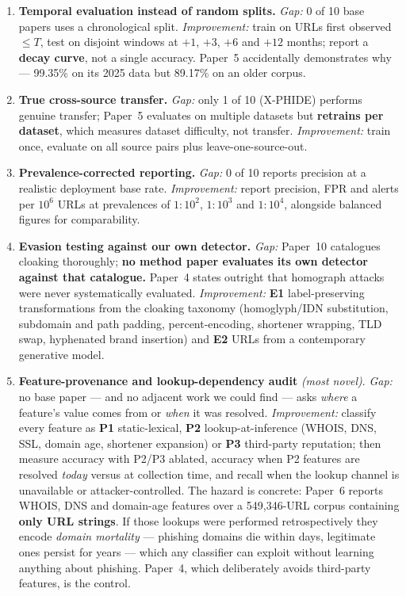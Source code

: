 \documentclass[10pt,a4paper]{article}
\begin{document}
\begin{enumerate}[label=\textbf{\arabic*.}]

\item \textbf{Temporal evaluation instead of random splits.}
\emph{Gap:} 0 of 10 base papers uses a chronological split.
\emph{Improvement:} train on URLs first observed $\le T$, test on disjoint windows at $+1$, $+3$,
$+6$ and $+12$ months; report a \textbf{decay curve}, not a single accuracy. Paper~5 accidentally
demonstrates why --- 99.35\% on its 2025 data but 89.17\% on an older corpus.

\item \textbf{True cross-source transfer.}
\emph{Gap:} only 1 of 10 (X-PHIDE) performs genuine transfer; Paper~5 evaluates on multiple
datasets but \textbf{retrains per dataset}, which measures dataset difficulty, not transfer.
\emph{Improvement:} train once, evaluate on all source pairs plus leave-one-source-out.

\item \textbf{Prevalence-corrected reporting.}
\emph{Gap:} 0 of 10 reports precision at a realistic deployment base rate.
\emph{Improvement:} report precision, FPR and alerts per $10^{6}$ URLs at prevalences of
$1{:}10^{2}$, $1{:}10^{3}$ and $1{:}10^{4}$, alongside balanced figures for comparability.

\item \textbf{Evasion testing against our own detector.}
\emph{Gap:} Paper~10 catalogues cloaking thoroughly; \textbf{no method paper evaluates its own
detector against that catalogue.} Paper~4 states outright that homograph attacks were never
systematically evaluated.
\emph{Improvement:} \textbf{E1} label-preserving transformations from the cloaking taxonomy
(homoglyph/IDN substitution, subdomain and path padding, percent-encoding, shortener wrapping,
TLD swap, hyphenated brand insertion) and \textbf{E2} URLs from a contemporary generative model.

\item \textbf{Feature-provenance and lookup-dependency audit} \emph{(most novel)}.
\emph{Gap:} no base paper --- and no adjacent work we could find --- asks \emph{where} a feature's
value comes from or \emph{when} it was resolved.
\emph{Improvement:} classify every feature as \textbf{P1} static-lexical, \textbf{P2}
lookup-at-inference (WHOIS, DNS, SSL, domain age, shortener expansion) or \textbf{P3} third-party
reputation; then measure accuracy with P2/P3 ablated, accuracy when P2 features are resolved
\emph{today} versus at collection time, and recall when the lookup channel is unavailable or
attacker-controlled. The hazard is concrete: Paper~6 reports WHOIS, DNS and domain-age features
over a 549,346-URL corpus containing \textbf{only URL strings}. If those lookups were performed
retrospectively they encode \emph{domain mortality} --- phishing domains die within days,
legitimate ones persist for years --- which any classifier can exploit without learning anything
about phishing. Paper~4, which deliberately avoids third-party features, is the control.


\end{enumerate}
\end{document}

